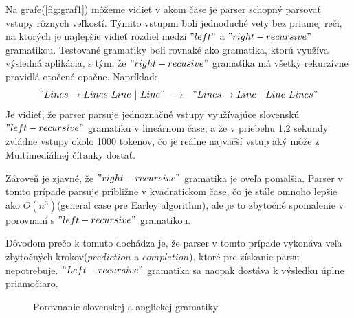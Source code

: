 \documentclass[12pt,a4paper]{report}
\theoremstyle{definition}
\theoremstyle{remark}
\begin{document}
Na grafe(\ref{fig:graf1}) môžeme vidieť v akom čase je parser schopný parsovať vstupy rôznych veľkostí. Týmito vstupmi boli jednoduché vety bez priamej reči, na ktorých je najlepšie vidieť rozdiel medzi $"left"$ a $"right-recursive"$ gramatikou. Testované gramatiky boli rovnaké ako gramatika, ktorú využíva výsledná aplikácia, s tým, že $"right-recusive"$ gramatika má všetky rekurzívne pravidlá otočené opačne. Napríklad:
$$"Lines \to Lines \ Line \ | \ Line" \ \ \to \ \ "Lines \to Line \ | \ Line \ Lines"$$
Je vidieť,  že parser parsuje jednoznačné vstupy využívajúce slovenskú $"left-recursive"$ gramatiku v lineárnom čase, a že v priebehu 1,2 sekundy zvládne vstupy okolo 1000 tokenov,  čo je reálne najväčší vstup aký môže z Multimediálnej čítanky dostať.

Zároveň je zjavné, že $"right-recursive"$ gramatika je oveľa pomalšia. Parser v tomto prípade parsuje približne v kvadratickom čase, čo je stále omnoho lepšie ako $O(n^3)$(general case pre Earley algorithm), ale je to zbytočné spomalenie v porovnaní s $"left-recursive"$ gramatikou. 

Dôvodom prečo k tomuto dochádza je, že parser v tomto prípade vykonáva veľa zbytočných krokov($prediction$ a $completion$), ktoré pre získanie parsu nepotrebuje. $"Left-recursive"$ gramatika sa naopak dostáva k výsledku úplne priamočiaro\cite{leftRightRecursive}.
\begin{center}
\begin{figure}[h]
\setlength{\belowcaptionskip}{-30pt}
\setlength{\floatsep}{0pt}
\caption{Porovnanie slovenskej a anglickej gramatiky} \label{fig:graf2}
\end{figure}
\end{center}
\end{document}
